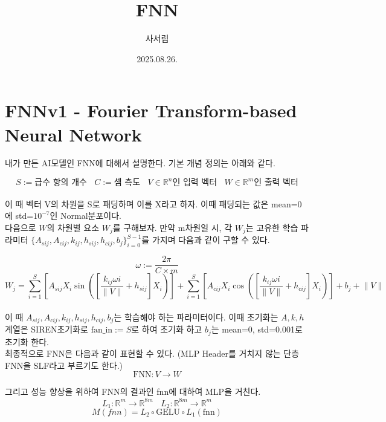 \documentclass{book}
\title{FNN}
\author{사서림}
\date{2025.08.26.}
\begin{document}
\maketitle

\tableofcontents

\chapter{FNNv1 - Fourier Transform-based Neural Network}

내가 만든 AI모델인 FNN에 대해서 설명한다. 기본 개념 정의는 아래와 같다.

\[
S :=\text{급수 항의 개수}~~~~ C:=\text{셈 측도} ~~~~ V \in \mathbb{R}^n\text{인 입력 벡터} ~~~~ W \in \mathbb{R}^m\text{인 출력 벡터}
\]\\

이 때 벡터 V의 차원을 S로 패딩하며 이를 X라고 하자. 이때 패딩되는 값은 mean=0에 std=$10^{-7}$인 Normal분포이다. \\

다음으로 $W$의 차원별 요소 $W_j$를 구해보자. 만약 m차원일 시, 각 $W_j$는 고유한 학습 파라미터 $\{A_{sij}, A_{cij}, k_{ij}, h_{sij}, h_{cij}, b_j\}_{i=0}^{S-1}$를 가지며 다음과 같이 구할 수 있다.

\[
\omega:=\frac{2 \pi}{C \times m}
\]
\[
W_j = \sum_{i=1}^{S}  \left [ A_{sij} X_i \sin \left ( \left [ \frac{k_{ij} \omega i}{\lVert V \rVert} + h_{sij} \right ] X_i \right ) \right ] +\sum_{i=1}^{S} \left [ A_{cij} X_i \cos \left ( \left [ \frac{k_{ij} \omega i}{\lVert V \rVert} + h_{cij} \right ] X_i \right ) \right ] + b_j + \lVert V \rVert
\]
\\
이 때 $A_{sij}, A_{cij}, k_{ij}, h_{sij}, h_{cij}, b_j$는 학습해야 하는 파라미터이다. 이때 초기화는 $A, k, h$ 계열은 SIREN초기화로 $\text{fan\_in}:=S$로 하여 초기화 하고 $b_j$는 mean=0, std=0.001로 초기화 한다.\\

최종적으로 FNN은 다음과 같이 표현할 수 있다. (MLP Header를 거치지 않는 단층 FNN을 SLF라고 부르기도 한다.)
\[
\text{FNN}:V \rightarrow W
\]

그리고 성능 향상을 위하여 FNN의 결과인 fnn에 대하여 MLP을 거친다. 
\[
L_1:\mathbb{R}^m\rightarrow \mathbb{R}^{8m}~~~~L_2:\mathbb{R}^{8m}\rightarrow \mathbb{R}^m
\]
\[
M(fnn) = L_2 \circ \text{GELU} \circ L_1(\text{fnn}) 
\]
\end{document}
